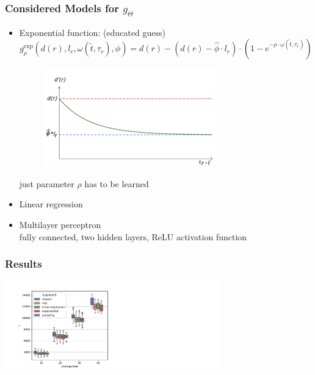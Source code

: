 \documentclass[aspectratio=1610]{beamer}
\newcommand{\important}[1]{{\color{green!60!black}#1}}
\begin{document}
\begin{frame}
	\frametitle{Considered Models for $g_\Theta$}
	\begin{itemize}
		\itemsep2ex
		\item \important{Exponential function}: (educated guess) 
		\begin{equation*}
				g^\mathrm{exp}_\rho(d(r), l_r, \omega(\tilde t, \tau_r), \hat\phi) = d(r) - (d(r)-\hat\phi \cdot l_r) \cdot (1-e^{-\rho \cdot \omega(\tilde t, \tau_r)})
		\end{equation*}
		\vspace{-7mm}
		\begin{figure}[tb]
			\centering
			\includegraphics[width=.550\columnwidth]{graphics/exp-model.png}
		\end{figure}
		just parameter $\rho$ has to be learned
		\item \important{Linear regression}
		\item \important{Multilayer perceptron}\\
		fully connected, two hidden layers, ReLU activation function
	\end{itemize}
\end{frame}


\begin{frame}
	\frametitle{Results}
	\centering
	\includegraphics[width=0.7\textwidth]{graphics/boxplots.pdf}
\end{frame}


	
\end{document}
